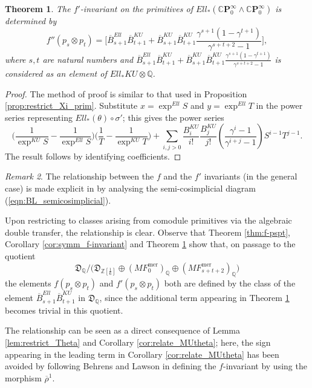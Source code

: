 \documentclass[10pt,a4paper]{amsart}
\newtheorem{thm}{Theorem}[section]
\theoremstyle{definition}
\theoremstyle{remark}
\newtheorem{rem}[thm]{Remark}
\newcommand{\rhobar}{\overline{\rho}}
\newcommand{\zedsix}{{\zed[{\scriptstyle{\frac{1}{6}}}]}}
\newcommand{\divBern}{\overline{B}}
\newcommand{\divcong}{\mathfrak{D}}
\newcommand{\zed}{\mathbb{Z}}
\newcommand{\rat}{\mathbb{Q}}
\newcommand{\mf}{{MF}}
\newcommand{\mfmero}{\mf^{\mathrm{mer}}}
\newcommand{\tmf}{{Ell}}
\newcommand{\tmfcoeff}{{Ell}}
\newcommand{\cp}{\mathbb{C} \mathbf{P}^\infty}
\renewcommand{\smash}{\wedge}
\begin{document}
\begin{thm}
\label{thm:fprime}
	The $f'$-invariant on the primitives of $\tmfcoeff_* (\cp_0\smash \cp_0) $ is determined by
\[
f'' (p_s \otimes p_t)
 =
\Big[
 \divBern^\tmf_{s+1}\divBern^{KU} _{t+1}
  + \divBern^{KU}_{s+1}\divBern^{KU}
_{t+1}\frac{\gamma^{s+1}(1- \gamma^{t+1}) }{\gamma^{s+t+2}-1}
\Big],
\]
where $s, t$ are natural numbers and $
 \divBern^\tmf_{s+1}\divBern^{KU} _{t+1}  + \divBern^{KU}_{s+1}\divBern^{KU}
_{t+1}\frac{\gamma^{s+1}(1- \gamma^{t+1}) }{\gamma^{s+t+2}-1}
$ is considered as an element of $\tmfcoeff_*KU \otimes \rat$.
\end{thm}

\begin{proof}
The method of proof is similar to that used in Proposition \ref{prop:restrict_Xi_prim}.
Substitute $x= \exp^\tmf S$ and $y = \exp^\tmf T$ in the power
series representing $\tmfcoeff_* (\theta) \circ \sigma'$; this gives the power series
 \[
\Big(  \frac{1}{\exp^{KU} S} - \frac{1}{\exp^\tmf S  }\Big)
\Big(\frac{1}{T} - \frac{1}{\exp^{KU} T }\Big)
+
\sum _{i, j >0}\frac{B_i^{KU}}{i!}\frac{B_j^{KU}}{j!}
\left(
\frac{\gamma^i -1}{\gamma^{i+j}-1}
\right)
S^{i-1}T  ^{j-1}.
\]
The result follows by identifying coefficients.
\end{proof}

\begin{rem}
\label{rem:relate_f,f'}
	The relationship between the $f$ and the $f'$ invariants (in the general case) is made explicit in \cite[Theorem 4.2]{behrens_laures} by analysing the semi-cosimplicial diagram (\ref{eqn:BL_semicosimplicial}).


Upon restricting to classes arising from comodule primitives via the algebraic double transfer, the relationship is clear. Observe that
Theorem \ref{thm:f-pspt}, Corollary \ref{cor:symm_f-invariant} and Theorem \ref{thm:fprime} show that,  on passage to the quotient $$\divcong _\rat / \Big(\divcong_\zedsix \oplus (\mfmero_0)_\rat \oplus
(\mfmero_{s+t+2})_\rat \Big)$$ the elements $f(p_s \otimes p_t)$ and $f'(p_s \otimes p_t)$ both are defined by the class of the  element $\divBern^\tmf_{s+1}\divBern^{KU} _{t+1}  $ in $\divcong_\rat$, since the additional term appearing in Theorem \ref{thm:fprime} becomes trivial in this quotient.

The relationship can be seen as  a direct consequence of  Lemma \ref{lem:restrict_Theta} and Corollary \ref{cor:relate_MUtheta}; here, the sign appearing in the leading term in Corollary \ref{cor:relate_MUtheta}  has been avoided by following Behrens and Lawson in defining the $f$-invariant by using the morphism $\rhobar^1$.


\end{rem}
\end{document}
